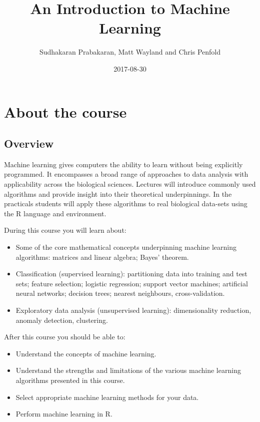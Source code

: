 \documentclass[]{book}
\title{An Introduction to Machine Learning}
\author{Sudhakaran Prabakaran, Matt Wayland and Chris Penfold}
\date{2017-08-30}
\providecommand{\tightlist}{%
  \setlength{\itemsep}{0pt}\setlength{\parskip}{0pt}}
\theoremstyle{definition}
\theoremstyle{definition}
\theoremstyle{definition}
\theoremstyle{remark}
\begin{document}
\maketitle

{
\setcounter{tocdepth}{1}
\tableofcontents
}
\chapter{About the course}\label{about-the-course}

\section{Overview}\label{overview}

Machine learning gives computers the ability to learn without being
explicitly programmed. It encompasses a broad range of approaches to
data analysis with applicability across the biological sciences.
Lectures will introduce commonly used algorithms and provide insight
into their theoretical underpinnings. In the practicals students will
apply these algorithms to real biological data-sets using the R language
and environment.

During this course you will learn about:

\begin{itemize}
\tightlist
\item
  Some of the core mathematical concepts underpinning machine learning
  algorithms: matrices and linear algebra; Bayes' theorem.
\item
  Classification (supervised learning): partitioning data into training
  and test sets; feature selection; logistic regression; support vector
  machines; artificial neural networks; decision trees; nearest
  neighbours, cross-validation.
\item
  Exploratory data analysis (unsupervised learning): dimensionality
  reduction, anomaly detection, clustering.
\end{itemize}

After this course you should be able to:

\begin{itemize}
\tightlist
\item
  Understand the concepts of machine learning.
\item
  Understand the strengths and limitations of the various machine
  learning algorithms presented in this course.
\item
  Select appropriate machine learning methods for your data.
\item
  Perform machine learning in R.
\end{itemize}
\end{document}
